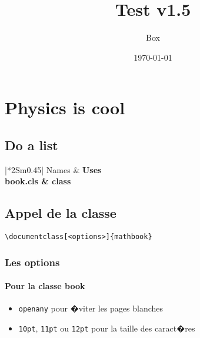 \documentclass[ams,openany,10pt,presentation,latin1]{mathbook}
\title{Test v1.5}
\author{Box}
\date{\today}
\begin{document}
\frontmatter

\maketitle

{
\makeatletter
\sectiontitle@font
\tableofcontents
\makeatother
}

\mainmatter


\chapter{Physics is cool}
\section{Do a list}

\begin{center}
\begin{tabular}{|*2{S{m{0.45\linewidth}}|}}
\hline\firstline
\color{bleu}Names & \color{bleu}\bfseries Uses\\
\hline
book.cls  &  class\\
\hline

\end{tabular}
\end{center}

\newpage

\section{Appel de la classe}

\begin{lstlisting}
\documentclass[<options>]{mathbook}
\end{lstlisting}

\subsection{Les options}

\subsubsection{Pour la classe \og book \fg}

\begin{itemize}
\item \texttt{openany} pour �viter les pages blanches
\item \texttt{10pt}, \texttt{11pt} ou \texttt{12pt} pour la taille des caract�res
\end{itemize}
\end{document}

